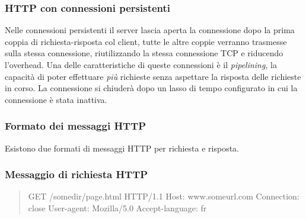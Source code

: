 \subsubsection*{HTTP con connessioni persistenti}
Nelle connessioni persistenti il server lascia aperta la connessione dopo la prima coppia di richiesta-risposta col client, tutte le altre coppie verranno trasmesse sulla stessa connessione, riutilizzando la stessa connessione TCP e riducendo l'overhead.
Una delle caratteristiche di queste connessioni è il \textit{pipelining}, la capacità di poter effettuare \textit{più} richieste senza aspettare la risposta delle richieste in corso.
La connessione si chiuderà dopo un lasso di tempo configurato in cui la connessione è stata inattiva.

\subsubsection{Formato dei messaggi HTTP}
Esistono due formati di messaggi HTTP per richiesta e risposta.

\subsubsection*{Messaggio di richiesta HTTP}
\begin{quote}
  GET /somedir/page.html HTTP/1.1 \newline
  Host: www.someurl.com \newline
  Connection: close \newline
  User-agent: Mozilla/5.0 \newline
  Accept-language: fr
\end{quote}

